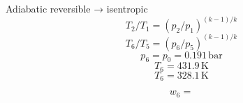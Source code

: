 Adiabatic reversible → isentropic  
\[ T_2 / T_1 = (p_2 / p_1)^{(k-1)/k} \]  
\[ T_6 / T_5 = (p_6 / p_5)^{(k-1)/k} \]  
\[ p_6 = p_0 = 0.191 \, \text{bar} \]  
\[ T_6 = 431.9 \, \text{K} \]  
\[ T_6 = 328.1 \, \text{K} \]  

\[ w_6 = \]